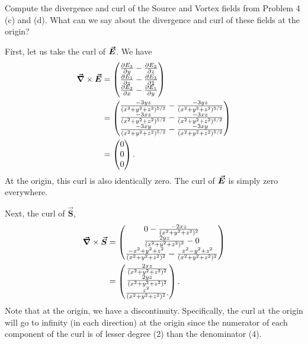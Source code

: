 \documentclass[12pt]{article} %
\begin{document}
\newpage
\begin{problem}
Compute the divergence and curl of the Source and Vortex fields from Problem 4 (c) and (d).  What can we say about the divergence and curl of these fields at the origin?
\end{problem}
\begin{solution}
    First, let us take the curl of $\boldsymbol{\vec{E}}$.  We have
    \begin{align*}
        \boldsymbol{\vec{\nabla}} \times \boldsymbol{\vec{E}} &= \begin{pmatrix} \frac{\partial E_3}{\partial y} - \frac{\partial E_2}{\partial z} \\ \frac{\partial E_1}{\partial z} -\frac{\partial E_3}{\partial 1} \\ \frac{\partial E_2}{\partial x} - \frac{\partial E_1}{\partial y} \end{pmatrix}\\
        &= \begin{pmatrix} \frac{-3yz}{(x^2+y^2+z^2)^{5/2}} - \frac{-3yz}{(x^2+y^2+z^2)^{5/2}} \\ \frac{-3xz}{(x^2+y^2+z^2)^{5/2}} - \frac{-3xz}{(x^2+y^2+z^2)^{5/2}} \\
        \frac{-3xy}{(x^2+y^2+z^2)^{5/2}} -\frac{-3xy}{(x^2+y^2+z^2)^{5/2}} \end{pmatrix}\\
        &= \begin{pmatrix} 0 \\ 0 \\ 0 \end{pmatrix}.
    \end{align*}
    At the origin, this curl is also identically zero.  The curl of $\boldsymbol{\vec{E}}$ is simply zero everywhere.

    Next, the curl of $\boldsymbol{\vec{S}}$,
        \begin{align*}
            \boldsymbol{\vec{\nabla}} \times \boldsymbol{\vec{S}} &= \begin{pmatrix} 0 - \frac{-2xz}{(x^2+y^2+z^2)^2} \\ \frac{2yz}{(x^2+y^2+z^2)^2} - 0 \\
            \frac{-x^2+y^2+z^2}{(x^2+y^2+z^2)^2}- \frac{x^2-y^2+z^2}{(x^2+y^2+z^2)^2}\end{pmatrix}\\
            &= \begin{pmatrix}  \frac{2xz}{(x^2+y^2+z^2)^2} \\ \frac{2yz}{(x^2+y^2+z^2)^2} \\ \frac{z^2}{(x^2+y^2+z^2)^2}. \end{pmatrix}.
        \end{align*}
    Note that at the origin, we have a discontinuity.  Specifically, the curl at the origin will go to infinity (in each direction) at the origin since the numerator of each component of the curl is of lesser degree (2) than the denominator (4).


\end{solution}
\end{document}
